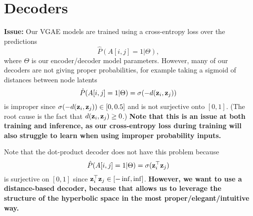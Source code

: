 

\section{Decoders}
\noindent
\textbf{Issue:} Our VGAE models are trained using a cross-entropy loss over the predictions
\begin{equation}
    \hat{P}(A[i,j] = 1 | \Theta),
\end{equation}
where $\Theta$ is our encoder/decoder model parameters. However, many of our decoders are not giving proper probabilities, 
for example taking a sigmoid of distances between node latents
\begin{equation}
    \hat{P}(A[i,j] = 1 | \Theta) = \sigma(-d(\mathbf{z}_i, \mathbf{z}_j))
\end{equation}
is improper since $\sigma(-d(\mathbf{z}_i, \mathbf{z}_j)) \in [0,0.5]$ and is not surjective onto $[0,1]$. (The root cause is the fact that $d(\mathbf{z}_i, \mathbf{z}_j) \geq 0$.)
{\bf Note that this is an issue at both training and inference, as our cross-entropy loss during training will also struggle to learn when using improper probability inputs.}


Note that the dot-product decoder does not have this problem because 
\begin{equation}
  \hat{P}(A[i,j] = 1 | \Theta) = \sigma(\mathbf{z}_i^\top \mathbf{z}_j) 
\end{equation}
is surjective on $[0,1]$ since $\mathbf{z}_i^\top \mathbf{z}_j\in [-\inf, \inf]$.
{\bf However, we want to use a distance-based decoder, because that allows us to leverage the structure of the hyperbolic space in the most proper/elegant/intuitive way.}\\


